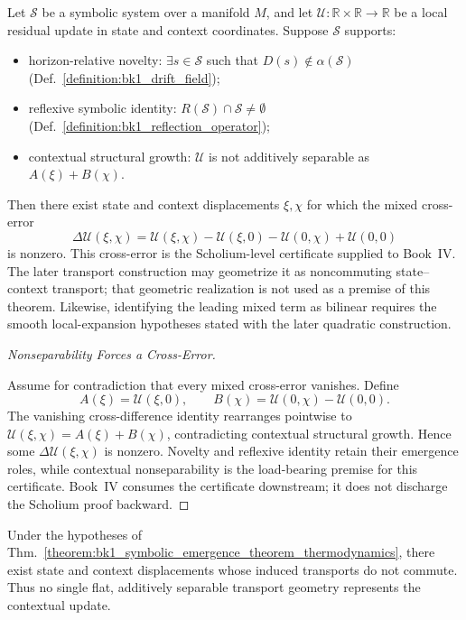 \begin{theorem}
\label{theorem:bk1_symbolic_emergence_theorem_thermodynamics}
Let $\mathcal{S}$ be a symbolic system over a manifold $M$, and let
$\mathcal{U}:\mathbb{R}\times\mathbb{R}\to\mathbb{R}$ be a local residual
update in state and context coordinates. Suppose $\mathcal{S}$ supports:
\begin{itemize}
  \item horizon-relative novelty: $\exists s\in\mathcal{S}$ such that $D(s)\notin\alpha(\mathcal{S})$ (Def.~\ref{definition:bk1_drift_field});
  \item reflexive symbolic identity: $R(\mathcal{S})\cap\mathcal{S}\neq\emptyset$ (Def.~\ref{definition:bk1_reflection_operator});
  \item contextual structural growth: $\mathcal{U}$ is not additively separable as $A(\xi)+B(\chi)$.
\end{itemize}
Then there exist state and context displacements $\xi,\chi$ for which the
mixed cross-error
\[
\Delta\mathcal{U}(\xi,\chi)
 =\mathcal{U}(\xi,\chi)-\mathcal{U}(\xi,0)
  -\mathcal{U}(0,\chi)+\mathcal{U}(0,0)
\]
is nonzero.  This cross-error is the Scholium-level certificate supplied to
Book~IV.  The later transport construction may geometrize it as noncommuting
state--context transport; that geometric realization is not used as a premise
of this theorem.  Likewise, identifying the leading mixed term as bilinear
requires the smooth local-expansion hypotheses stated with the later
quadratic construction.
\end{theorem}
\begin{proof}[Nonseparability Forces a Cross-Error]
\label{proof:bk1_symbolic_emergence_theorem_thermodynamics}
\leavevmode

Assume for contradiction that every mixed cross-error vanishes.  Define
\[
 A(\xi)=\mathcal U(\xi,0),
 \qquad
 B(\chi)=\mathcal U(0,\chi)-\mathcal U(0,0).
\]
The vanishing cross-difference identity rearranges pointwise to
$\mathcal U(\xi,\chi)=A(\xi)+B(\chi)$, contradicting contextual structural
growth.  Hence some $\Delta\mathcal U(\xi,\chi)$ is nonzero.  Novelty and
reflexive identity retain their emergence roles, while contextual
nonseparability is the load-bearing premise for this certificate.  Book~IV
consumes the certificate downstream; it does not discharge the Scholium proof
backward.
\end{proof}
\begin{corollary}
\label{corollary:bk1_necessity_of_non_euclidean_symbolic_space}
Under the hypotheses of
Thm.~\ref{theorem:bk1_symbolic_emergence_theorem_thermodynamics}, there exist
state and context displacements whose induced transports do not commute.
Thus no single flat, additively separable transport geometry represents the
contextual update.
\end{corollary}
